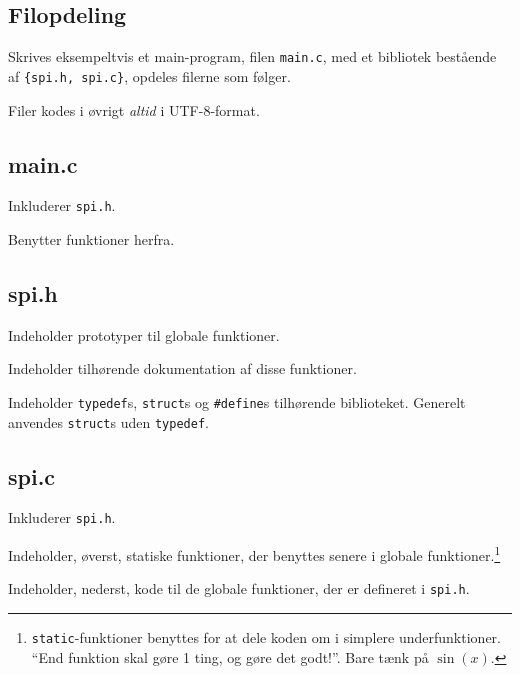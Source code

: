 \documentclass[article, 10pt]{memoir}
\let\tempone\itemize
\let\temptwo\enditemize
\renewenvironment{itemize}{\tempone\firmlist}{\temptwo}
\begin{document}
\begin{multicols}{2}
    \chapter{Filopdeling}
    Skrives eksempeltvis et main-program, filen \texttt{main.c}, med et bibliotek bestående af \texttt{\{spi.h, spi.c\}}, opdeles filerne som følger. 

    Filer kodes i øvrigt \emph{altid} i UTF-8-format.

    \section{main.c}
    \begin{itemize}
    \item Inkluderer \texttt{spi.h}.
    \item Benytter funktioner herfra.
    \end{itemize}

    \section{spi.h}
    \begin{itemize}
    \item Indeholder prototyper til globale funktioner.
    \item Indeholder tilhørende dokumentation af disse funktioner.
    \item Indeholder \texttt{typedef}s, \texttt{struct}s og \texttt{\#define}s tilhørende biblioteket. Generelt anvendes \texttt{struct}s uden \texttt{typedef}.
    \end{itemize}

    \section{spi.c}
    \begin{itemize}
    \item Inkluderer \texttt{spi.h}.
    \item Indeholder, øverst, statiske funktioner, der benyttes senere i globale funktioner.\footnote{\texttt{static}-funktioner benyttes for at dele koden om i simplere underfunktioner. ``End funktion skal gøre 1 ting, og gøre det godt!''. Bare tænk på $\sin(x)$.}
    \item Indeholder, nederst, kode til de globale funktioner, der er defineret i \texttt{spi.h}.
    \end{itemize}
\end{multicols}
\end{document}
